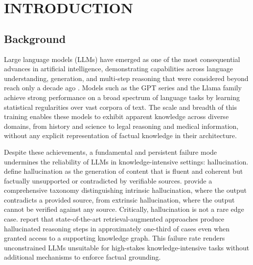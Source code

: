 
\chapter{INTRODUCTION}

\ifpdf
	\graphicspath{{introduction/figures/PNG}{introduction/figures/PDF}{introduction/figures}}
\else
	\graphicspath{{introduction/figures/EPS}{introduction/figures}}
\fi

\section{Background}

Large language models (LLMs) have emerged as one of the most consequential advances in artificial intelligence, demonstrating capabilities across language understanding, generation, and multi-step reasoning that were considered beyond reach only a decade ago \citep{brown2020gpt3,achiam2023gpt4}. Models such as the GPT series \citep{brown2020gpt3,achiam2023gpt4} and the Llama family \citep{touvron2023llama,dubey2024llama} achieve strong performance on a broad spectrum of language tasks by learning statistical regularities over vast corpora of text. The scale and breadth of this training enables these models to exhibit apparent knowledge across diverse domains, from history and science to legal reasoning and medical information, without any explicit representation of factual knowledge in their architecture.

Despite these achievements, a fundamental and persistent failure mode undermines the reliability of LLMs in knowledge-intensive settings: hallucination. \citet{ji2023survey} define hallucination as the generation of content that is fluent and coherent but factually unsupported or contradicted by verifiable sources. \citet{huang2023survey} provide a comprehensive taxonomy distinguishing intrinsic hallucination, where the output contradicts a provided source, from extrinsic hallucination, where the output cannot be verified against any source. Critically, hallucination is not a rare edge case. \citet{luo2024gcr} report that state-of-the-art retrieval-augmented approaches produce hallucinated reasoning steps in approximately one-third of cases even when granted access to a supporting knowledge graph. This failure rate renders unconstrained LLMs unsuitable for high-stakes knowledge-intensive tasks without additional mechanisms to enforce factual grounding.

